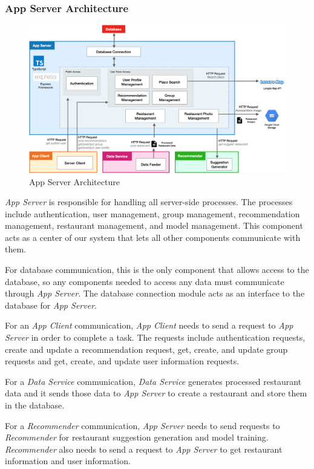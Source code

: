 \documentclass[12pt,oneside,openright,a4paper]{cpe-english-project}
\begin{document}
\newpage
\subsubsection{App Server Architecture}

\begin{figure}[H]\centering
\includegraphics[width=360pt]{./images/3arch_appserver.png}
\caption{App Server Architecture}\label{fig:3arch_appserver}
\end{figure}\vspace{-24pt}

\textit{App Server} is responsible for handling all server-side processes. The processes include authentication, user management, group management, recommendation management, restaurant management, and model management. This component acts as a center of our system that lets all other components communicate with them.

For database communication, this is the only component that allows access to the database, so any components needed to access any data must communicate through \textit{App Server}. The database connection module acts as an interface to the database for \textit{App Server}.

For an \textit{App Client} communication, \textit{App Client} needs to send a request to \textit{App Server} in order to complete a task. The requests include authentication requests, create and update a recommendation request, get, create, and update group requests and get, create, and update user information requests.

For a \textit{Data Service} communication, \textit{Data Service} generates processed restaurant data and it sends those data to \textit{App Server} to create a restaurant and store them in the database.

For a \textit{Recommender} communication, \textit{App Server} needs to send requests to \textit{Recommender} for restaurant suggestion generation and model training. \textit{Recommender} also needs to send a request to \textit{App Server} to get restaurant information and user information.
\end{document}
